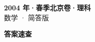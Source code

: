 \documentclass[zihao=-4, a4paper]{ctexart}
\begin{document}
\begin{center}
  {\Large\bfseries 2004 年·春季北京卷·理科}\\[4pt]
  {\large 数学 · 简答版}
\end{center}
\medskip
{}

\clearpage
{}
\begin{center}{\Large\bfseries 答案速查}\end{center}
\medskip

\end{document}
